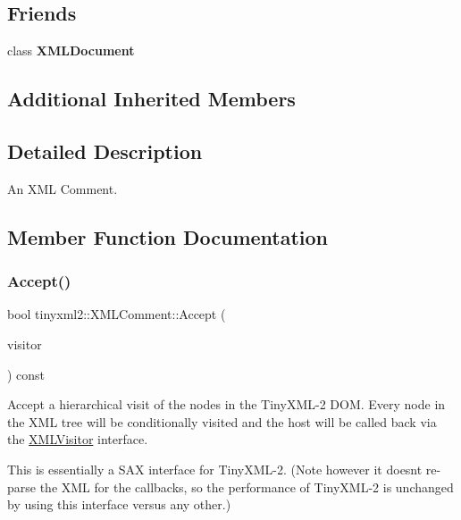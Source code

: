 \subsection*{Friends}
\begin{DoxyCompactItemize}
\item 
\mbox{\label{classtinyxml2_1_1_x_m_l_comment_a4eee3bda60c60a30e4e8cd4ea91c4c6e}} 
class {\bfseries X\+M\+L\+Document}
\end{DoxyCompactItemize}
\subsection*{Additional Inherited Members}


\subsection{Detailed Description}
An X\+ML Comment. 

\subsection{Member Function Documentation}
\mbox{\label{classtinyxml2_1_1_x_m_l_comment_a27b37d16cea01b5329dfbbb4f9508e39}} 
\subsubsection{\texorpdfstring{Accept()}{Accept()}}
{\footnotesize\ttfamily bool tinyxml2\+::\+X\+M\+L\+Comment\+::\+Accept (\begin{DoxyParamCaption}\item[{\hyperlink{classtinyxml2_1_1_x_m_l_visitor}{X\+M\+L\+Visitor} $\ast$}]{visitor }\end{DoxyParamCaption}) const\hspace{0.3cm}{\ttfamily [virtual]}}

Accept a hierarchical visit of the nodes in the Tiny\+X\+M\+L-\/2 D\+OM. Every node in the X\+ML tree will be conditionally visited and the host will be called back via the \hyperlink{classtinyxml2_1_1_x_m_l_visitor}{X\+M\+L\+Visitor} interface.

This is essentially a S\+AX interface for Tiny\+X\+M\+L-\/2. (Note however it doesn\textquotesingle{}t re-\/parse the X\+ML for the callbacks, so the performance of Tiny\+X\+M\+L-\/2 is unchanged by using this interface versus any other.)

